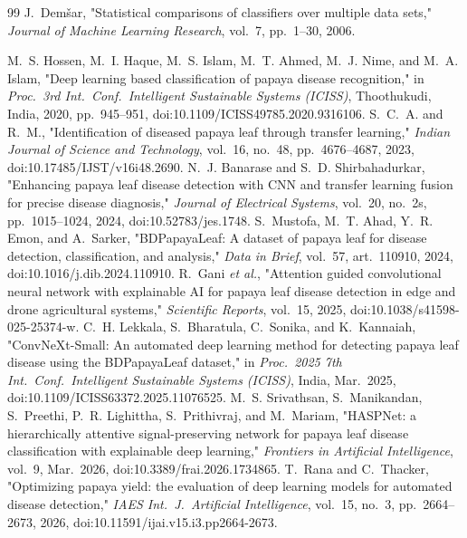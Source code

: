 \documentclass[10pt,twocolumn,a4paper]{article}
\begin{document}
{\begin{thebibliography}{99}
 J.~Dem\v{s}ar, "Statistical comparisons of classifiers over multiple data sets," \emph{Journal of Machine Learning Research}, vol.~7, pp.~1--30, 2006.

 M.~S. Hossen, M.~I. Haque, M.~S. Islam, M.~T. Ahmed, M.~J. Nime, and M.~A. Islam, "Deep learning based classification of papaya disease recognition," in \emph{Proc.\ 3rd Int.\ Conf.\ Intelligent Sustainable Systems (ICISS)}, Thoothukudi, India, 2020, pp.~945--951, doi:10.1109/ICISS49785.2020.9316106.
 S.~C.~A. and R.~M., "Identification of diseased papaya leaf through transfer learning," \emph{Indian Journal of Science and Technology}, vol.~16, no.~48, pp.~4676--4687, 2023, doi:10.17485/IJST/v16i48.2690.
 N.~J. Banarase and S.~D. Shirbahadurkar, "Enhancing papaya leaf disease detection with CNN and transfer learning fusion for precise disease diagnosis," \emph{Journal of Electrical Systems}, vol.~20, no.~2s, pp.~1015--1024, 2024, doi:10.52783/jes.1748.
 S.~Mustofa, M.~T. Ahad, Y.~R. Emon, and A.~Sarker, "BDPapayaLeaf: A dataset of papaya leaf for disease detection, classification, and analysis," \emph{Data in Brief}, vol.~57, art.~110910, 2024, doi:10.1016/j.dib.2024.110910.
 R.~Gani \emph{et al.}, "Attention guided convolutional neural network with explainable AI for papaya leaf disease detection in edge and drone agricultural systems," \emph{Scientific Reports}, vol.~15, 2025, doi:10.1038/s41598-025-25374-w.
 C.~H. Lekkala, S.~Bharatula, C.~Sonika, and K.~Kannaiah, "ConvNeXt-Small: An automated deep learning method for detecting papaya leaf disease using the BDPapayaLeaf dataset," in \emph{Proc.\ 2025 7th Int.\ Conf.\ Intelligent Sustainable Systems (ICISS)}, India, Mar.\ 2025, doi:10.1109/ICISS63372.2025.11076525.
 M.~S. Srivathsan, S.~Manikandan, S.~Preethi, P.~R. Lighittha, S.~Prithivraj, and M.~Mariam, "HASPNet: a hierarchically attentive signal-preserving network for papaya leaf disease classification with explainable deep learning," \emph{Frontiers in Artificial Intelligence}, vol.~9, Mar.\ 2026, doi:10.3389/frai.2026.1734865.
 T.~Rana and C.~Thacker, "Optimizing papaya yield: the evaluation of deep learning models for automated disease detection," \emph{IAES Int.\ J.\ Artificial Intelligence}, vol.~15, no.~3, pp.~2664--2673, 2026, doi:10.11591/ijai.v15.i3.pp2664-2673.

\end{thebibliography}}
\end{document}
